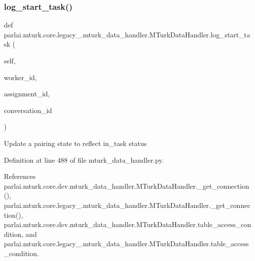 \subsubsection{\texorpdfstring{log\+\_\+start\+\_\+task()}{log\_start\_task()}}
{\footnotesize\ttfamily def parlai.\+mturk.\+core.\+legacy\+\_.\+mturk\+\_\+data\+\_\+handler.\+M\+Turk\+Data\+Handler.\+log\+\_\+start\+\_\+task (\begin{DoxyParamCaption}\item[{}]{self,  }\item[{}]{worker\+\_\+id,  }\item[{}]{assignment\+\_\+id,  }\item[{}]{conversation\+\_\+id }\end{DoxyParamCaption})}

\begin{DoxyVerb}Update a pairing state to reflect in_task status\end{DoxyVerb}
 

Definition at line 488 of file mturk\+\_\+data\+\_\+handler.\+py.



References parlai.\+mturk.\+core.\+dev.\+mturk\+\_\+data\+\_\+handler.\+M\+Turk\+Data\+Handler.\+\_\+get\+\_\+connection(), parlai.\+mturk.\+core.\+legacy\+\_.\+mturk\+\_\+data\+\_\+handler.\+M\+Turk\+Data\+Handler.\+\_\+get\+\_\+connection(), parlai.\+mturk.\+core.\+dev.\+mturk\+\_\+data\+\_\+handler.\+M\+Turk\+Data\+Handler.\+table\+\_\+access\+\_\+condition, and parlai.\+mturk.\+core.\+legacy\+\_.\+mturk\+\_\+data\+\_\+handler.\+M\+Turk\+Data\+Handler.\+table\+\_\+access\+\_\+condition.

